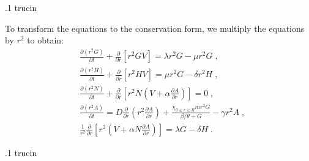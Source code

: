\documentclass{amsart}
\theoremstyle{definition}
\theoremstyle{remark}
\numberwithin{equation}{section}
\numberwithin{figure}{section}
\newcommand{\po}[1]{\frac{\partial}{\partial{#1}}}
\newcommand{\pp}[2]{\frac{\partial {#1}}{\partial {#2}}}
\begin{document}
\vglue .1 truein

To transform the equations to the conservation form, we multiply the equations by $r^2$ to obtain:
\begin{subequations}\label{eq:eqn_pde_csrv}
\begin{align}
\label{eq:eqn_pde_csrv_g}
&\pp{(r^2G)}{t} + \po{r}\left[r^2 G V\right] = \lambda r^2G - \mu r^2G\;, \\
\label{eq:eqn_pde_csrv_h}
&\pp{(r^2H)}{t} + \po{r}\left[r^2H V\right] = \mu r^2G - \delta r^2H\;, \\
\label{eq:eqn_pde_csrv_n}
&\pp{(r^2N)}{t} + \po{r}\left[r^2N\left(V+\alpha\pp{A}{r}\right)\right] = 0\;,\\
\label{eq:eqn_pde_csrv_a}
&\pp{(r^2A)}{t} = D\po{r}\left(r^2\pp{A}{r}\right) + \frac{\chi_{0\le r\le R}mr^2G}{\beta/\theta+G} - \gamma r^2A\;,\\
\label{eq:eqn_pde_csrv_v}
&\frac{1}{r^2}\po{r}\left[r^2\left(V+\alpha N\pp{A}{r}\right)\right] = \lambda G - \delta H\;.
\end{align}
\end{subequations}

\vglue .1 truein
\end{document}
